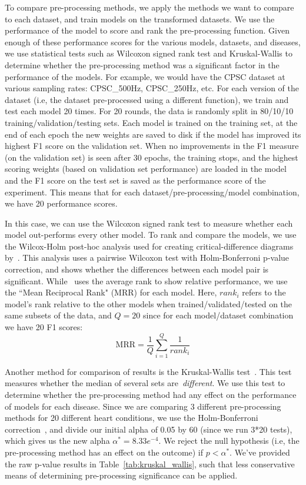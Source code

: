 \documentclass[pmlr,twocolumn]{jmlr}%
\begin{document}
To compare pre-processing methods, we apply the methods we want to compare to each dataset, and train models on the transformed datasets. We use the performance of the model to score and rank the pre-processing function. Given enough of these performance scores for the various models, datasets, and diseases, we use statistical tests such as Wilcoxon signed rank test and Kruskal-Wallis to determine whether the pre-processing method was a significant factor in the performance of the models. For example, we would have the CPSC dataset at various sampling rates: CPSC\_500Hz, CPSC\_250Hz, etc. For each version of the dataset (i.e, the dataset pre-processed using a different function), we train and test each model 20 times. For 20 rounds, the data is randomly split in 80/10/10 training/validation/testing sets. Each model is trained on the training set, at the end of each epoch the new weights are saved to disk if the model has improved its highest F1 score on the validation set. When no improvements in the F1 measure (on the validation set) is seen after 30 epochs, the training stops, and the highest scoring weights (based on validation set performance) are loaded in the model and the F1 score on the test set is saved as the performance score of the experiment. This means that for each dataset/pre-processing/model combination, we have 20 performance scores. 

In this case, we can use the Wilcoxon signed rank test to measure whether each model out-performs every other model. To rank and compare the models, we use the Wilcox-Holm post-hoc analysis used for creating critical-difference diagrams by~\cite{IsmailFawaz2018deep}. This analysis uses a pairwise Wilcoxon test with Holm-Bonferroni p-value correction, and shows whether the differences between each model pair is significant. While~\cite{IsmailFawaz2018deep} uses the average rank to show relative performance, we use the ``Mean Reciprocal Rank" (MRR) for each model. Here, $rank_i$ refers to the model's rank relative to the other models when trained/validated/tested on the same subsets of the data, and $Q=20$ since for each model/dataset combination we have 20 F1 scores:
\[ \text{MRR} = \frac{1}{Q}\sum_{i=1}^{Q}\frac{1}{rank_i} \]

Another method for comparison of results is the Kruskal-Wallis test~\cite{kruskal1952use,ostertagova2014methodology}. This test measures whether the median of several sets are~\textit{different}. We use this test to determine whether the pre-processing method had any effect on the performance of models for each disease. Since we are comparing 3 different pre-processing methods for 20 different heart conditions, we use the Holm-Bonferroni correction~\cite{holm1979simple,abdi2010holm}, and divide our initial alpha of 0.05 by 60 (since we run 3*20 tests), which gives us the new alpha $\alpha^*=8.33e^{-4}$. We reject the null hypothesis (i.e, the pre-processing method has an effect on the outcome) if $p<\alpha^*$. We've provided the raw p-value results in Table~\ref{tab:kruskal_wallis}, such that less conservative means of determining pre-processing significance can be applied.
\end{document}
